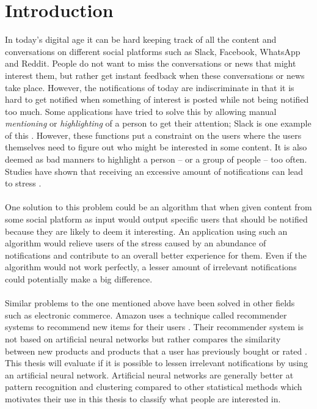 \chapter{Introduction}\label{chap:intro}
In today’s digital age it can be hard keeping track of all the content and conversations on different social platforms such as Slack, Facebook, WhatsApp and Reddit. People do not want to miss the conversations or news that might interest them, but rather get instant feedback when these conversations or news take place. However, the notifications of today are indiscriminate in that it is hard to get notified when something of interest is posted while not being notified too much. Some applications have tried to solve this by allowing manual \textit{mentioning} or \textit{highlighting} of a person to get their attention; Slack is one example of this \parencite{slack}. However, these functions put a constraint on the users where the users themselves need to figure out who might be interested in some content. It is also deemed as bad manners to highlight a person -- or a group of people -- too often. Studies have shown that receiving an excessive amount of notifications can lead to stress \parencite{relaffinity}.
\\\\
One solution to this problem could be an algorithm that when given content from some social platform as input would output specific users that should be notified because they are likely to deem it interesting. An application using such an algorithm would relieve users of the stress caused by an abundance of notifications and contribute to an overall better experience for them. Even if the algorithm would not work perfectly, a lesser amount of irrelevant notifications could potentially make a big difference.
\\\\
Similar problems to the one mentioned above have been solved in other fields such as electronic commerce. Amazon uses a technique called recommender systems to recommend new items for their users \parencite{amazonfiltering}. Their recommender system is not based on artificial neural networks but rather compares the similarity between new products and products that a user has previously bought or rated \parencite{amazonfiltering}. This thesis will evaluate if it is possible to lessen irrelevant notifications by using an artificial neural network. Artificial neural networks are generally better at pattern recognition and clustering compared to other statistical methods \parencite{basheer2000artificial} which motivates their use in this thesis to classify what people are interested in.

